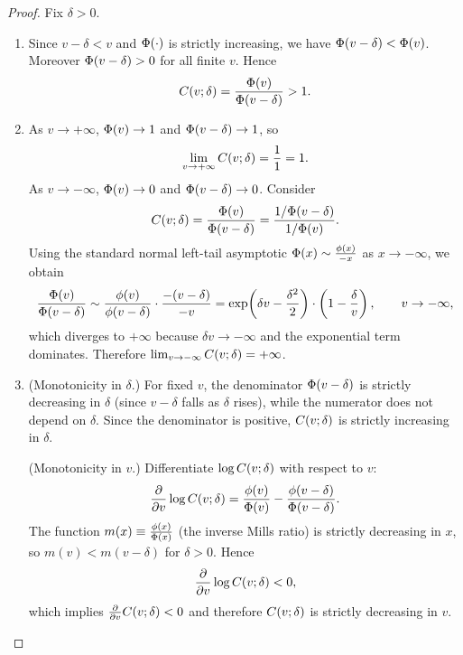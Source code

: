 \begin{proof}
Fix $\delta>0$.

\begin{enumerate}
    \item Since $v-\delta < v$ and $\Phi(\cdot)$ is strictly increasing, we have
    $\Phi(v-\delta) < \Phi(v)$. Moreover $\Phi(v-\delta)>0$ for all finite $v$.
    Hence
    \[
        C\!\left(v;\delta\right)=\frac{\Phi(v)}{\Phi(v-\delta)} > 1.
    \]

    \item As $v\to +\infty$, $\Phi(v)\to 1$ and $\Phi(v-\delta)\to 1$, so
    \[
        \lim_{v\to +\infty}C\!\left(v;\delta\right)= \frac{1}{1}=1.
    \]
    As $v\to -\infty$, $\Phi(v)\to 0$ and $\Phi(v-\delta)\to 0$. Consider
    \[
        C\!\left(v;\delta\right)=\frac{\Phi(v)}{\Phi(v-\delta)}
        =\frac{1/\Phi(v-\delta)}{1/\Phi(v)}.
    \]
    Using the standard normal left-tail asymptotic $\Phi(x)\sim \frac{\phi(x)}{-x}$ as
    $x\to -\infty$, we obtain
    \[
        \frac{\Phi(v)}{\Phi(v-\delta)}
        \sim
        \frac{\phi(v)}{\phi(v-\delta)}\cdot \frac{-(v-\delta)}{-v}
        =
        \exp\!\left(\delta v-\frac{\delta^2}{2}\right)\cdot\left(1-\frac{\delta}{v}\right),
        \qquad v\to -\infty,
    \]
    which diverges to $+\infty$ because $\delta v\to -\infty$ and the exponential term dominates.
    Therefore $\lim_{v\to -\infty}C\!\left(v;\delta\right)=+\infty$.

    \item (Monotonicity in $\delta$.) For fixed $v$, the denominator $\Phi(v-\delta)$ is strictly
    decreasing in $\delta$ (since $v-\delta$ falls as $\delta$ rises), while the numerator does not
    depend on $\delta$. Since the denominator is positive, $C\!\left(v;\delta\right)$ is strictly increasing
    in $\delta$.

    (Monotonicity in $v$.) Differentiate $\log C\!\left(v;\delta\right)$ with respect to $v$:
    \[
        \frac{\partial}{\partial v}\log C\!\left(v;\delta\right)
        = \frac{\phi(v)}{\Phi(v)} - \frac{\phi(v-\delta)}{\Phi(v-\delta)}.
    \]
    The function $m(x)\equiv \frac{\phi(x)}{\Phi(x)}$ (the inverse Mills ratio) is strictly
    decreasing in $x$, so $m(v) < m(v-\delta)$ for $\delta>0$. Hence
    \[
        \frac{\partial}{\partial v}\log C\!\left(v;\delta\right) < 0,
    \]
    which implies $\frac{\partial}{\partial v}C\!\left(v;\delta\right)<0$ and therefore $C\!\left(v;\delta\right)$
    is strictly decreasing in $v$.
\end{enumerate}
\end{proof}
